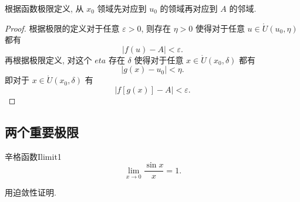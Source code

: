 \documentclass[cn,toc=twocol]{elegantbook}
\begin{document}
\begin{idea*}
根据函数极限定义, 从 $x_0$ 领域先对应到 $u_0$ 的领域再对应到 $A$ 的邻域.
\end{idea*}

\begin{proof}
根据极限的定义对于任意 $\varepsilon > 0$, 则存在 $\eta > 0$ 使得对于任意 $u \in \mathring{U}(u_0,\eta)$ 都有
\[
	\lvert f(u) - A \rvert < \varepsilon.
\]
再根据极限定义, 对这个 $eta$ 存在 $\delta$ 使得对于任意 $x \in \mathring{U}(x_0,\delta)$ 都有
\[
	\lvert g(x) - u_0 \rvert < \eta.
\]
即对于 $x \in \mathring{U}(x_0,\delta)$ 有
\[
	\lvert f[g(x)] - A \rvert < \varepsilon.
\]

\end{proof}
\smallskip

\subsection{两个重要极限}

\begin{theorem}{辛格函数}{Ilimit1}
\[
	\lim_{x \to 0}\frac{\sin x}{x} = 1.
\]	
\end{theorem}

\begin{idea*}
	用迫敛性证明.
\end{idea*}
\end{document}
